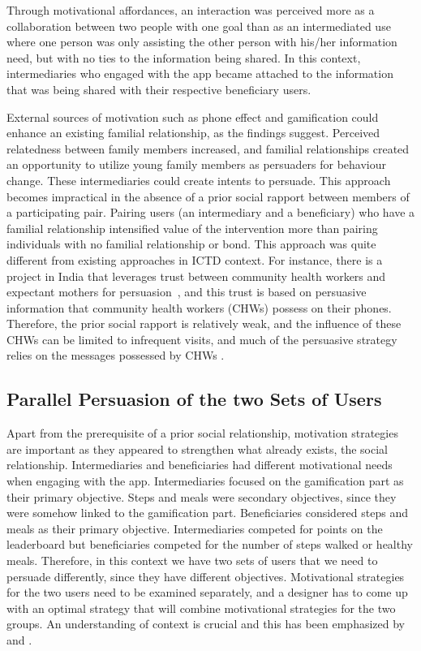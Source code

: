 Through motivational affordances, an interaction was perceived more as a collaboration between two people with one goal than as an intermediated use where one person was only assisting the other person with his/her information need, but with no ties to the information being shared. In this context, intermediaries who engaged with the app became attached to the information that was being shared with their respective beneficiary users.

External sources of motivation such as phone effect and gamification could enhance an existing familial relationship, as the findings suggest. Perceived relatedness between family members increased, and familial relationships created an opportunity to utilize young family members as persuaders for behaviour change. These intermediaries could create intents to persuade. This approach becomes impractical in the absence of a prior social rapport between members of a participating pair. Pairing users (an intermediary and a beneficiary) who have a familial relationship intensified value of the intervention more than pairing individuals with no familial relationship or bond. This approach was quite different from existing approaches in ICTD context.  For instance, there is a project in India that leverages trust between community health workers and expectant mothers for  persuasion~\citep{ramachandran2010mobile,ramachandran2010research}, and this trust is based on persuasive information that community health workers (CHWs) possess on their phones. Therefore, the prior social rapport is relatively weak, and the  influence of these CHWs can be limited to infrequent visits, and much of the persuasive strategy relies on the messages possessed by CHWs \citep{katule2016leveraging}. 

\subsection{Parallel Persuasion of the two Sets of Users} 
Apart from the prerequisite of a prior social relationship, motivation strategies are important as they appeared to strengthen what already exists, the social relationship. Intermediaries and beneficiaries had different motivational needs when engaging with the app. Intermediaries focused on the gamification part as their primary objective. Steps and meals were secondary objectives, since they were somehow linked to the gamification part. Beneficiaries considered steps and meals as their primary objective. Intermediaries competed for points on the leaderboard but beneficiaries competed for the number of steps walked or healthy meals. Therefore, in this context we have two sets of users that we need to persuade differently, since they have different objectives. Motivational strategies for the two users need to be examined separately, and a designer has to come up with an optimal strategy that will combine motivational strategies for the two groups. An understanding of context is crucial and this has been emphasized by~\cite{Oinas-kukkonen:psd} and \cite{Oinas-Kukkonen:foundation}. 

